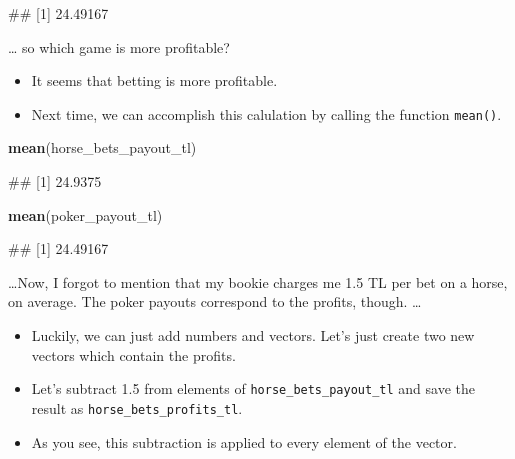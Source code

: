 \documentclass[
]{book}
\newenvironment{Shaded}{\begin{snugshade}}{\end{snugshade}}
\newcommand{\FunctionTok}[1]{\textcolor[rgb]{0.13,0.29,0.53}{\textbf{#1}}}
\newcommand{\NormalTok}[1]{#1}
\begin{document}
\begin{Shaded}
\begin{Highlighting}[]
\NormalTok{\#\# [1] 24.49167}
\end{Highlighting}
\end{Shaded}

\ldots{} so which game is more profitable?

\begin{itemize}
\item
  It seems that betting is more profitable.
\item
  Next time, we can accomplish this calulation by calling the function \texttt{mean()}.
\end{itemize}

\begin{Shaded}
\begin{Highlighting}[]
\FunctionTok{mean}\NormalTok{(horse\_bets\_payout\_tl)}
\end{Highlighting}
\end{Shaded}

\begin{Shaded}
\begin{Highlighting}[]
\NormalTok{\#\# [1] 24.9375}
\end{Highlighting}
\end{Shaded}

\begin{Shaded}
\begin{Highlighting}[]
\FunctionTok{mean}\NormalTok{(poker\_payout\_tl)}
\end{Highlighting}
\end{Shaded}

\begin{Shaded}
\begin{Highlighting}[]
\NormalTok{\#\# [1] 24.49167}
\end{Highlighting}
\end{Shaded}

\ldots Now, I forgot to mention that my bookie charges me 1.5 TL per bet on a horse, on average. The poker payouts correspond to the profits, though. \ldots 

\begin{itemize}
\item
  Luckily, we can just add numbers and vectors. Let's just create two new vectors which contain the profits.
\item
  Let's subtract 1.5 from elements of \texttt{horse\_bets\_payout\_tl} and save the result as \texttt{horse\_bets\_profits\_tl}.
\item
  As you see, this subtraction is applied to every element of the vector.
\end{itemize}
\end{document}
